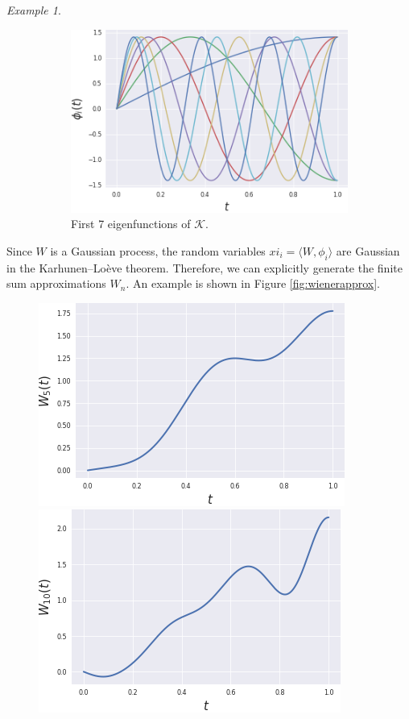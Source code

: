 \documentclass[10pt, a4paper]{report}
\newcommand{\K}[0]{\mathcal{K}}
\theoremstyle{definition}
\theoremstyle{remark}
\newtheorem{ex}{Example}
\begin{document}
\begin{ex}
\begin{figure}[H]
\begin{subfigure}{.5\textwidth}
		\end{subfigure}%
		\begin{subfigure}{.5\textwidth}
			\centering
			\includegraphics[width=.9\linewidth]{Code/images/12/eigfs}
			\caption{First 7 eigenfunctions of $\K$.}
		\end{subfigure}
		\caption{}
		\label{fig:eigpairwien}
	\end{figure}
	Since $W$ is a Gaussian process, the random variables $xi_i = \langle W,\phi_i\rangle$ are Gaussian in the Karhunen–Loève theorem. Therefore, we can explicitly generate the finite sum approximations $W_n$. An example is shown in Figure \ref{fig:wienerapprox}.
	
	\begin{figure}[h]
		\centering
		\includegraphics[width=.4\textwidth]{Code/images/12/approx6}\quad
		\includegraphics[width=.4\textwidth]{Code/images/12/approx11}
		
		\medskip
		

\end{figure}
\end{ex}
\end{document}

